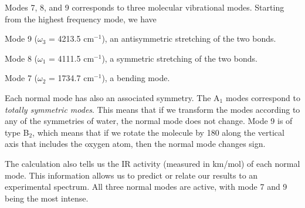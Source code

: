 \documentclass[../Main/chem371-notes.tex]{subfiles}
\begin{document}
Modes 7, 8, and 9 corresponds to three molecular vibrational modes.
Starting from the highest frequency mode, we have
\begin{myitems}
\item  Mode 9 ($\omega_3$ = 4213.5 cm$^{-1}$), an antisymmetric stretching of the two  bonds.
\item Mode 8 ($\omega_1$ = 4111.5 cm$^{-1}$), a symmetric stretching of the two  bonds.
\item Mode 7 ($\omega_2$ = 1734.7 cm$^{-1}$), a  bending mode. 
\end{myitems}
Each normal mode has also an associated symmetry. The A$_1$ modes correspond to \emph{totally symmetric modes}.
This means that if we transform the modes according to any of the symmetries of water, the normal mode does not change.
Mode 9 is of type B$_2$, which means that if we rotate the molecule by 180\textdegree{} along the vertical axis that includes the oxygen atom, then the normal mode changes sign.

The calculation also tells us the IR activity (measured in km/mol) of each normal mode. This information allows us to predict or relate our results to an experimental spectrum. All three normal modes are active, with mode 7 and 9 being the most intense.
\end{document}
